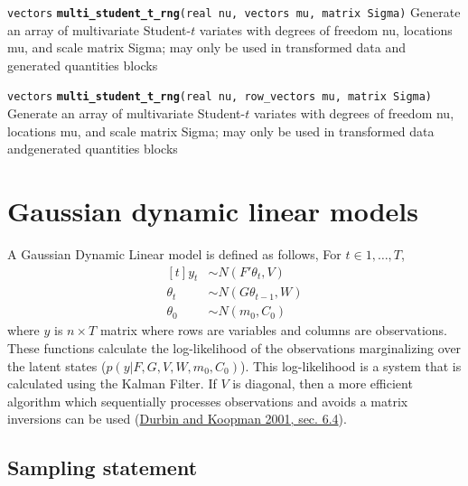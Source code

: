 \documentclass[
  10pt,
]{book}
\begin{document}

\texttt{vectors} \textbf{\texttt{multi\_student\_t\_rng}}\texttt{(real\ nu,\ vectors\ mu,\ matrix\ Sigma)}\newline
Generate an array of multivariate Student-\(t\) variates with degrees of
freedom nu, locations mu, and scale matrix Sigma; may only be used in
transformed data and generated quantities blocks


\texttt{vectors} \textbf{\texttt{multi\_student\_t\_rng}}\texttt{(real\ nu,\ row\_vectors\ mu,\ matrix\ Sigma)}\newline
Generate an array of multivariate Student-\(t\) variates with degrees of
freedom nu, locations mu, and scale matrix Sigma; may only be used in
transformed data andgenerated quantities blocks

\hypertarget{gaussian-dynamic-linear-models}{%
\section{Gaussian dynamic linear models}\label{gaussian-dynamic-linear-models}}

A Gaussian Dynamic Linear model is defined as follows, For \(t \in 1, \dots, T\), \[   \begin{aligned}[t]     y_{t} &\sim N(F' \theta_{t}, V)
\\     \theta_{t} &\sim N(G \theta_{t - 1}, W) \\     \theta_{0} &\sim
N(m_{0}, C_{0})   \end{aligned} \] where \(y\) is \(n \times T\) matrix
where rows are variables and columns are observations. These functions
calculate the log-likelihood of the observations marginalizing over
the latent states (\(p(y | F, G, V, W, m_{0}, C_{0})\)). This
log-likelihood is a system that is calculated using the Kalman Filter.
If \(V\) is diagonal, then a more efficient algorithm which sequentially
processes observations and avoids a matrix inversions can be used
(\protect\hyperlink{ref-DurbinKoopman:2001}{Durbin and Koopman 2001, sec. 6.4}).

\hypertarget{sampling-statement-55}{%
\subsection{Sampling statement}\label{sampling-statement-55}}
\end{document}
